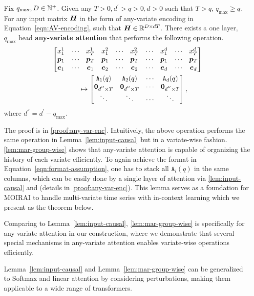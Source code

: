 \begin{lemma}\label{lem:mar-group-wise}
Fix $q_{\max}, D \in \mathbb{N}^+$.
Given any $T > 0, d^\prime > q > 0, d > 0$ such that $T > q$, $q_{\max} \geq q$.
For any input matrix $\bm{H}$ in the form of any-variate encoding in Equation~\ref{eqn:AV-encoding}, such that $\bm{H} \in \mathbb{R}^{ D \times dT}$.
There exists a one layer, $q_{\max}$ head \textbf{any-variate attention} that performs the following operation.
    \begin{align*}
    &
    \begin{bmatrix}
        x_1^1 & \cdots & x_{T}^1 & x_1^2 & \cdots & x_T^2 & \cdots & x_1^d & \cdots & x_T^d
        \\
        \bm{p}_1 & \cdots & \bm{p}_{T} & \bm{p}_1 & \cdots & \bm{p}_T & \cdots & \bm{p}_1 & \cdots & \bm{p}_T
        \\
        \bm{e}_1 & \cdots & \bm{e}_1 & \bm{e}_2 & \cdots & \bm{e}_2 & \cdots & \bm{e}_d & \cdots & \bm{e}_d
    \end{bmatrix}
    \\ 
    &\quad\quad\quad\quad\mapsto
    \begin{bmatrix}
        \mathtt{A}_1(q) & \mathtt{A}_2(q) & \cdots & \mathtt{A}_d(q)
        \\
        \bm{0}_{d^{''} \times T} & \bm{0}_{d^{''} \times T} & \cdots & \bm{0}_{d^{''} \times T}   
        \\
        \ddots & \ddots & \cdots & \ddots 
    \end{bmatrix},
    \end{align*}
    where $d^{''}  = d^\prime - q_{\max}$.
\end{lemma}
The proof is in \cref{proof:any-var-enc}.
Intuitively, the above operation performs the same operation in Lemma~\ref{lem:input-causal} but in a variate-wise fashion.
\cref{lem:mar-group-wise} shows that any-variate attention is capable of organizing the history of each variate efficiently.
To again achieve the format in Equation~\eqref{eqn:format-assumption}, one has to stack all $\mathtt{A}_i(q)$ in the same columns, which can be easily done by a single layer of attention via \cref{lem:input-causal} and \citep[Proposition~A.5]{bai2024transformers} (details in \cref{proof:any-var-enc}).
This lemma serves as a foundation for MOIRAI to handle multi-variate time series with in-context learning which we present as the theorem below.
\begin{remark}
        Comparing to Lemma~\ref{lem:input-causal}, \cref{lem:mar-group-wise} is specifically for any-variate attention in our construction, where we demonstrate that several special mechanisms in any-variate attention enables variate-wise operations efficiently.
\end{remark}
\begin{remark}    
        Lemma~\ref{lem:input-causal} and Lemma~\ref{lem:mar-group-wise} can be generalized to Softmax and linear attention by considering perturbations, making them applicable to a wide range of transformers.    
\end{remark}

